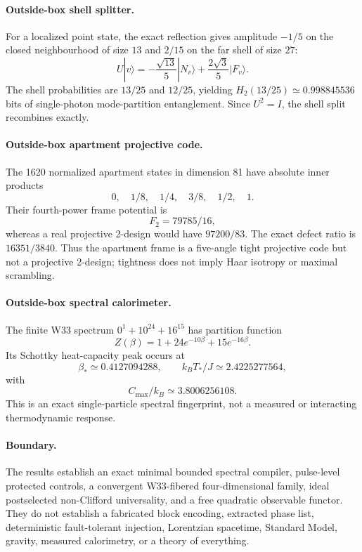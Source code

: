 \paragraph{Outside-box shell splitter.}
For a localized point state, the exact reflection gives amplitude $-1/5$ on
the closed neighbourhood of size $13$ and $2/15$ on the far shell of size
$27$:
\[
U|v\rangle=-\frac{\sqrt{13}}5|N_v\rangle+
\frac{2\sqrt3}{5}|F_v\rangle.
\]
The shell probabilities are $13/25$ and $12/25$, yielding
$H_2(13/25)\simeq0.998845536$ bits of single-photon mode-partition
entanglement.  Since $U^2=I$, the shell split recombines exactly.

\paragraph{Outside-box apartment projective code.}
The 1620 normalized apartment states in dimension 81 have absolute inner
products
\[
0,\quad1/8,\quad1/4,\quad3/8,\quad1/2,\quad1.
\]
Their fourth-power frame potential is
\[
F_2=79785/16,
\]
whereas a real projective 2-design would have $97200/83$.  The exact defect
ratio is $16351/3840$.  Thus the apartment frame is a five-angle tight
projective code but not a projective 2-design; tightness does not imply Haar
isotropy or maximal scrambling.

\paragraph{Outside-box spectral calorimeter.}
The finite W33 spectrum $0^1+10^{24}+16^{15}$ has partition function
\[
Z(\beta)=1+24e^{-10\beta}+15e^{-16\beta}.
\]
Its Schottky heat-capacity peak occurs at
\[
\beta_*\simeq0.4127094288,
\qquad k_BT_*/J\simeq2.4225277564,
\]
with
\[
C_{\max}/k_B\simeq3.8006256108.
\]
This is an exact single-particle spectral fingerprint, not a measured or
interacting thermodynamic response.

\paragraph{Boundary.}
The results establish an exact minimal bounded spectral compiler, pulse-level
protected controls, a convergent W33-fibered four-dimensional family, ideal
postselected non-Clifford universality, and a free quadratic observable
functor.  They do not establish a fabricated block encoding, extracted phase
list, deterministic fault-tolerant injection, Lorentzian spacetime, Standard
Model, gravity, measured calorimetry, or a theory of everything.
